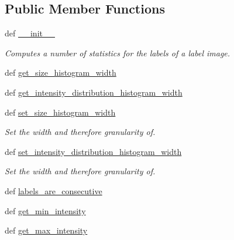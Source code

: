 \subsection*{Public Member Functions}
\begin{DoxyCompactItemize}
\item 
def \hyperlink{classmedpy_1_1filter_1_1LabelImageStatistics_1_1LabelImageStatistics_a930a01ac2051dbe15724f1e15190a490}{\_\-\_\-init\_\-\_\-}
\begin{DoxyCompactList}\small\item\em Computes a number of statistics for the labels of a label image. \end{DoxyCompactList}\item 
def \hyperlink{classmedpy_1_1filter_1_1LabelImageStatistics_1_1LabelImageStatistics_aa4b41c43fb9700962e483b6f450b4710}{get\_\-size\_\-histogram\_\-width}
\item 
def \hyperlink{classmedpy_1_1filter_1_1LabelImageStatistics_1_1LabelImageStatistics_a13532e9b0424fca8258bde4f6f4f1a6a}{get\_\-intensity\_\-distribution\_\-histogram\_\-width}
\item 
def \hyperlink{classmedpy_1_1filter_1_1LabelImageStatistics_1_1LabelImageStatistics_af9ec002c180c90a40ca414727145103d}{set\_\-size\_\-histogram\_\-width}
\begin{DoxyCompactList}\small\item\em Set the width and therefore granularity of. \end{DoxyCompactList}\item 
def \hyperlink{classmedpy_1_1filter_1_1LabelImageStatistics_1_1LabelImageStatistics_aa0c7b77ccddc07ab789eb1d5bb5cbc5f}{set\_\-intensity\_\-distribution\_\-histogram\_\-width}
\begin{DoxyCompactList}\small\item\em Set the width and therefore granularity of. \end{DoxyCompactList}\item 
def \hyperlink{classmedpy_1_1filter_1_1LabelImageStatistics_1_1LabelImageStatistics_a157a8d51427bf37302ca4a06c1aedb65}{labels\_\-are\_\-consecutive}
\item 
def \hyperlink{classmedpy_1_1filter_1_1LabelImageStatistics_1_1LabelImageStatistics_aa2f28c8938d0c378f4c61eff849bf9fb}{get\_\-min\_\-intensity}
\item 
def \hyperlink{classmedpy_1_1filter_1_1LabelImageStatistics_1_1LabelImageStatistics_afa86e54a37287134a82f44caf14e995a}{get\_\-max\_\-intensity}
\item 

\end{DoxyCompactItemize}
